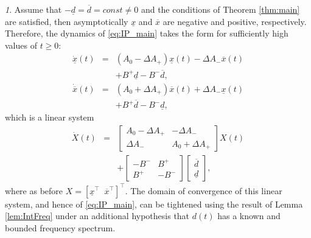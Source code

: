 \documentclass[twocolumn,english]{IEEEtran}
\theoremstyle{plain}
\theoremstyle{definition}
\theoremstyle{plain}
\theoremstyle{plain}
\theoremstyle{remark}
\newtheorem{rem}{\protect\remarkname}
\providecommand{\remarkname}{Remark}
\begin{document}
\begin{rem}
Assume that $-\underline{d}=\overline{d}=const\ne0$ and the conditions of Theorem \ref{thm:main} are satisfied, then asymptotically $\underline{x}$ and $\overline{x}$ are negative and positive, respectively. Therefore, the dynamics of \eqref{eq:IP_main} takes the form for sufficiently high values of $t\geq0$:
\begin{eqnarray*}
\dot{\underline{x}}(t) & = & (A_{0}-\Delta A_{+})\underline{x}(t)-\Delta A_{-}\overline{x}(t)\\
 &  & +B^{+}\underline{d}-B^{-}\overline{d},\\
\dot{\overline{x}}(t) & = & (A_{0}+\Delta A_{+})\overline{x}(t)+\Delta A_{-}\underline{x}(t)\\
 &  & +B^{+}\overline{d}-B^{-}\underline{d},
\end{eqnarray*}
which is a linear system
\begin{eqnarray*}
\dot{X}(t) & = & \left[\begin{array}{cc}
A_{0}-\Delta A_{+} & -\Delta A_{-}\\
\Delta A_{-} & A_{0}+\Delta A_{+}
\end{array}\right]X(t)\\
 &  & +\left[\begin{array}{cc}
-B^{-} & B^{+}\\
B^{+} & -B^{-}
\end{array}\right]\left[\begin{array}{c}
\overline{d}\\
\underline{d}
\end{array}\right],
\end{eqnarray*}
where as before $X=[\underline{x}^{\top}\;\;\overline{x}^{\top}]^{\top}$.
The domain of convergence of this linear system, and hence of \eqref{eq:IP_main}, can be tightened using the result of Lemma \ref{lem:IntFreq} under an additional hypothesis that $d(t)$ has a known and bounded frequency spectrum.
\end{rem}
\end{document}
